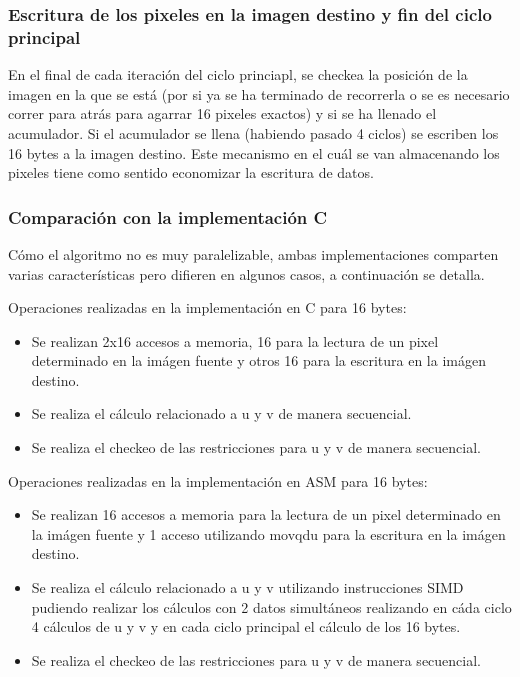 \subsubsection{Escritura de los pixeles en la imagen destino y fin del ciclo principal}

En el final de cada iteración del ciclo princiapl, se checkea la posición de la imagen en la que se está (por si ya se ha terminado de recorrerla o se es necesario correr para atrás para agarrar 16 pixeles exactos) y si se ha llenado el acumulador. Si el acumulador se llena (habiendo pasado 4 ciclos) se escriben los 16 bytes a la imagen destino. Este mecanismo en el cuál se van almacenando los pixeles tiene como sentido economizar la escritura de datos.

\subsubsection{Comparación con la implementación C}
Cómo el algoritmo no es muy paralelizable, ambas implementaciones comparten varias características pero difieren en algunos casos, a continuación se detalla.

Operaciones realizadas en la implementación en C para 16 bytes:
\begin{itemize}
\item Se realizan 2x16 accesos a memoria, 16 para la lectura de un pixel determinado en la imágen fuente y otros 16 para la escritura en la imágen destino.
\item Se realiza el cálculo relacionado a u y v de manera secuencial.
\item Se realiza el checkeo de las restricciones para u y v de manera secuencial.
\end{itemize}

Operaciones realizadas en la implementación en ASM para 16 bytes:
\begin{itemize}
\item Se realizan 16 accesos a memoria para la lectura de un pixel determinado en la imágen fuente y 1 acceso utilizando movqdu para la escritura en la imágen destino.
\item Se realiza el cálculo relacionado a u y v utilizando instrucciones SIMD pudiendo realizar los cálculos con 2 datos simultáneos realizando en cáda ciclo 4 cálculos de u y v y en cada ciclo principal el cálculo de los 16 bytes.
\item Se realiza el checkeo de las restricciones para u y v de manera secuencial.
\end{itemize}

